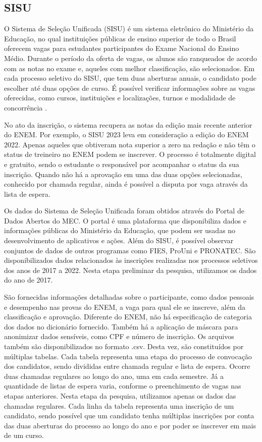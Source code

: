 \subsection{SISU}
O Sistema de Seleção Unificada (SISU) é um sistema eletrônico do Ministério da Educação, no qual instituições públicas de ensino superior de todo o Brasil oferecem vagas para estudantes participantes do Exame Nacional do Ensino Médio. Durante o período da oferta de vagas, os alunos são ranqueados de acordo com as notas no exame e, aqueles com melhor classificação, são selecionados. Em cada processo seletivo do SISU, que tem duas aberturas anuais, o candidato pode escolher até duas opções de curso. É possível verificar informações sobre as vagas oferecidas, como cursos, instituições e localizações, turnos e modalidade de concorrência \autocite{mec:1}.

No ato da inscrição, o sistema recupera as notas da edição mais recente anterior do ENEM. Por exemplo, o SISU 2023 leva em consideração a edição do ENEM 2022. Apenas aqueles que obtiveram nota superior a zero na redação e não têm o status de treineiro no ENEM podem se inscrever. O processo é totalmente digital e gratuito, sendo o estudante o responsável por acompanhar o status da sua inscrição. Quando não há a aprovação em uma das duas opções selecionadas, conhecido por chamada regular, ainda é possível a disputa por vaga através da lista de espera.

Os dados do Sistema de Seleção Unificada foram obtidos através do Portal de Dados Abertos do MEC. O portal é uma plataforma que disponibiliza dados e informações públicas do Ministério da Educação, que podem ser usadas no desenvolvimento de aplicativos e ações. Além do SISU, é possível observar conjuntos de dados de outros programas como FIES, ProUni e PRONATEC. São disponibilizados dados relacionados às inscrições realizadas nos processos seletivos dos anos de 2017 a 2022.  Nesta etapa preliminar da pesquisa, utilizamos os dados do ano de 2017.

São fornecidas informações detalhadas sobre o participante, como dados pessoais e desempenho nas provas do ENEM, a vaga para qual ele se inscreve, além da classificação e aprovação. Diferente do ENEM, não há especificação de categoria dos dados no dicionário fornecido. Também há a aplicação de máscara para anonimizar dados sensíveis, como CPF e número de inscrição. Os arquivos também são disponibilizados no formato .csv. Desta vez, são constituídos por múltiplas tabelas. Cada tabela representa uma etapa do processo de convocação dos candidatos, sendo divididas entre chamada regular e lista de espera. Ocorre duas chamadas regulares ao longo do ano, uma em cada semestre. Já a quantidade de listas de espera varia, conforme o preenchimento de vagas nas etapas anteriores. Nesta etapa da pesquisa, utilizamos apenas os dados das chamadas regulares. Cada linha da tabela representa uma inscrição de um candidato, sendo possível que um candidato tenha múltiplas inscrições por conta das duas aberturas do processo ao longo do ano e por poder se inscrever em mais de um curso.

